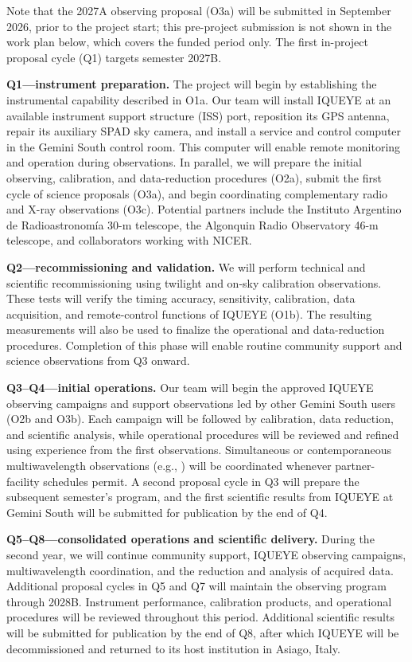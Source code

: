 \documentclass[
    11pt,
    a4paper,
    ]{article}
\begin{document}
Note that the 2027A observing proposal (O3a) will be submitted in September 2026, prior to the project start; this pre-project submission is not shown in the work plan below, which covers the funded period only. The first in-project proposal cycle (Q1) targets semester 2027B.

\textbf{Q1---instrument preparation.} The project will begin by establishing the instrumental capability described in O1a. Our team will install IQUEYE at an available instrument support structure (ISS) port, reposition its GPS antenna, repair its auxiliary SPAD sky camera, and install a service and control computer in the Gemini South control room. This computer will enable remote monitoring and operation during observations. In parallel, we will prepare the initial observing, calibration, and data-reduction procedures (O2a), submit the first cycle of science proposals (O3a), and begin coordinating complementary radio and X-ray observations (O3c). Potential partners include the Instituto Argentino de Radioastronomía 30-m telescope, the Algonquin Radio Observatory 46-m telescope, and collaborators working with NICER.

\textbf{Q2---recommissioning and validation.} We will perform technical and scientific recommissioning using twilight and on-sky calibration observations. These tests will verify the timing accuracy, sensitivity, calibration, data acquisition, and remote-control functions of IQUEYE (O1b). The resulting measurements will also be used to finalize the operational and data-reduction procedures. Completion of this phase will enable routine community support and science observations from Q3 onward.

\textbf{Q3--Q4---initial operations.} Our team will begin the approved IQUEYE observing campaigns and support observations led by other Gemini South users (O2b and O3b). Each campaign will be followed by calibration, data reduction, and scientific analysis, while operational procedures will be reviewed and refined using experience from the first observations. Simultaneous or contemporaneous multiwavelength observations (e.g., \cite{2023A&A...676A..17T,2021Univ....7...76N}) will be coordinated whenever partner-facility schedules permit. A second proposal cycle in Q3 will prepare the subsequent semester's program, and the first scientific results from IQUEYE at Gemini South will be submitted for publication by the end of Q4.

\textbf{Q5--Q8---consolidated operations and scientific delivery.} During the second year, we will continue community support, IQUEYE observing campaigns, multiwavelength coordination, and the reduction and analysis of acquired data. Additional proposal cycles in Q5 and Q7 will maintain the observing program through 2028B. Instrument performance, calibration products, and operational procedures will be reviewed throughout this period. Additional scientific results will be submitted for publication by the end of Q8, after which IQUEYE will be decommissioned and returned to its host institution in Asiago, Italy.
\end{document}
